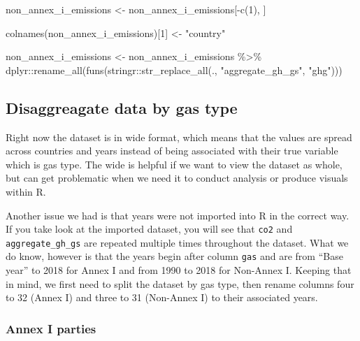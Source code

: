 \documentclass[
  12pt,
]{article}
\newenvironment{Shaded}{}{}
\newcommand{\DecValTok}[1]{\textcolor[rgb]{0.25,0.63,0.44}{#1}}
\newcommand{\FunctionTok}[1]{\textcolor[rgb]{0.02,0.16,0.49}{#1}}
\newcommand{\NormalTok}[1]{#1}
\newcommand{\OtherTok}[1]{\textcolor[rgb]{0.00,0.44,0.13}{#1}}
\newcommand{\SpecialCharTok}[1]{\textcolor[rgb]{0.25,0.44,0.63}{#1}}
\newcommand{\StringTok}[1]{\textcolor[rgb]{0.25,0.44,0.63}{#1}}
\begin{document}
\begin{Shaded}
\begin{Highlighting}[]
\NormalTok{non\_annex\_i\_emissions }\OtherTok{\textless{}{-}}\NormalTok{ non\_annex\_i\_emissions[}\SpecialCharTok{{-}}\FunctionTok{c}\NormalTok{(}\DecValTok{1}\NormalTok{), }
\NormalTok{    ]}

\FunctionTok{colnames}\NormalTok{(non\_annex\_i\_emissions)[}\DecValTok{1}\NormalTok{] }\OtherTok{\textless{}{-}} \StringTok{"country"}

\NormalTok{non\_annex\_i\_emissions }\OtherTok{\textless{}{-}}\NormalTok{ non\_annex\_i\_emissions }\SpecialCharTok{\%\textgreater{}\%}
\NormalTok{    dplyr}\SpecialCharTok{::}\FunctionTok{rename\_all}\NormalTok{(}\FunctionTok{funs}\NormalTok{(stringr}\SpecialCharTok{::}\FunctionTok{str\_replace\_all}\NormalTok{(., }
        \StringTok{"aggregate\_gh\_gs"}\NormalTok{, }\StringTok{"ghg"}\NormalTok{)))}
\end{Highlighting}
\end{Shaded}

\hypertarget{disaggreagate-data-by-gas-type}{%
\subsection{Disaggreagate data by gas
type}\label{disaggreagate-data-by-gas-type}}

Right now the dataset is in wide format, which means that the values are
spread across countries and years instead of being associated with their
true variable which is gas type. The wide is helpful if we want to view
the dataset as whole, but can get problematic when we need it to conduct
analysis or produce visuals within R.

Another issue we had is that years were not imported into R in the
correct way. If you take look at the imported dataset, you will see that
\texttt{co2} and \texttt{aggregate\_gh\_gs} are repeated multiple times
throughout the dataset. What we do know, however is that the years begin
after column \texttt{gas} and are from ``Base year'' to 2018 for Annex I
and from 1990 to 2018 for Non-Annex I. Keeping that in mind, we first
need to split the dataset by gas type, then rename columns four to 32
(Annex I) and three to 31 (Non-Annex I) to their associated years.

\hypertarget{annex-i-parties-2}{%
\subsubsection{Annex I parties}\label{annex-i-parties-2}}
\end{document}
